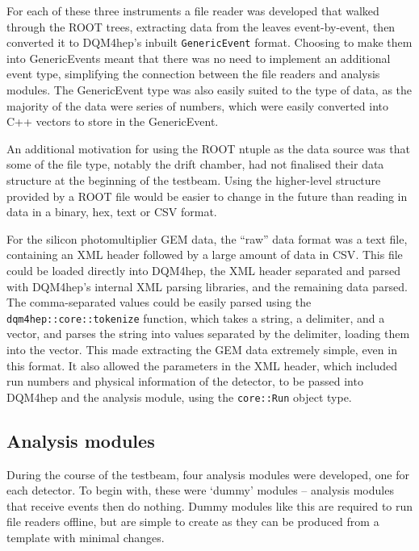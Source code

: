 For each of these three instruments a file reader was developed that walked through the ROOT trees, extracting data from the leaves event-by-event, then converted it to \acrshort{DQM4hep}'s inbuilt \texttt{GenericEvent} format. Choosing to make them into GenericEvents meant that there was no need to implement an additional event type, simplifying the connection between the file readers and analysis modules. The GenericEvent type was also easily suited to the type of data, as the majority of the data were series of numbers, which were easily converted into C++ vectors to store in the GenericEvent.

An additional motivation for using the ROOT ntuple as the data source was that some of the file type, notably the drift chamber, had not finalised their data structure at the beginning of the testbeam. Using the higher-level structure provided by a ROOT file would be easier to change in the future than reading in data in a binary, hex, text or \acrshort{CSV} format.

For the silicon photomultiplier \acrshort{GEM} data, the ``raw'' data format was a text file, containing an \acrshort{XML} header followed by a large amount of data in \acrfull{CSV}. This file could be loaded directly into \acrshort{DQM4hep}, the \acrshort{XML} header separated and parsed with \acrshort{DQM4hep}'s internal \acrshort{XML} parsing libraries, and the remaining data parsed. The comma-separated values could be easily parsed using the \texttt{dqm4hep::core::tokenize} function, which takes a string, a delimiter, and a vector, and parses the string into values separated by the delimiter, loading them into the vector. This made extracting the \acrshort{GEM} data extremely simple, even in this format. It also allowed the parameters in the \acrshort{XML} header, which included run numbers and physical information of the detector, to be passed into DQM4hep and the analysis module, using the \texttt{core::Run} object type.

\subsection{Analysis modules}
During the course of the testbeam, four analysis modules were developed, one for each detector. To begin with, these were `dummy' modules -- analysis modules that receive events then do nothing. Dummy modules like this are required to run file readers offline, but are simple to create as they can be produced from a template with minimal changes.

